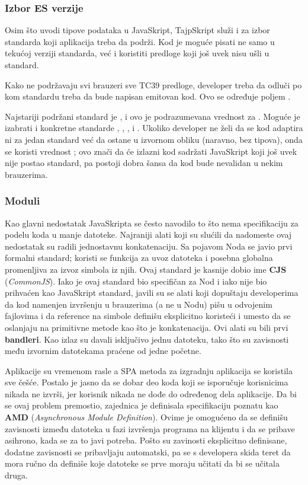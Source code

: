 \subsubsection{Izbor ES verzije}

Osim što uvodi tipove podataka u JavaSkript, TajpSkript služi i za izbor standarda koji aplikacija treba da podrži.
Kod je moguće pisati ne samo u tekućoj verziji standarda, već i koristiti predloge koji još uvek nisu ušli u standard.

Kako ne podržavaju svi brauzeri sve TC39 predloge, developer treba da odluči po kom standardu treba da bude napisan emitovan kod.
Ovo se određuje poljem .

Najstariji podržani standard je , i ovo je podrazumevana vrednost za .
Moguće je izabrati i konkretne standarde , , ,  i .
Ukoliko developer ne želi da se kod adaptira ni za jedan standard već da ostane u izvornom obliku (naravno, bez tipova), onda se koristi vrednost ; ovo znači da će izlazni kod sadržati JavaSkript koji još uvek nije postao standard, pa postoji dobra šansa da kod bude nevalidan u nekim brauzerima.

\subsubsection{Moduli}

Kao glavni nedostatak JavaSkripta se često navodilo to što nema specifikaciju za podelu koda u manje datoteke.
Najraniji alati koji su slućili da nadomeste ovaj nedostatak su radili jednostavnu konkatenaciju.
Sa pojavom Noda se javio prvi formalni standard; koristi se funkcija  za uvoz datoteka i posebna globalna promenljiva  za izvoz simbola iz njih.
Ovaj standard je kasnije dobio ime \textbf{CJS} (\textsl{CommonJS}).
Iako je ovaj standard bio specifičan za Nod i iako nije bio prihvaćen kao JavaSkript standard, javili su se alati koji dopuštaju developerima da kod namenjen izvršenju u brauzerima (a ne u Nodu) pišu u odvojenim fajlovima i da reference na simbole definišu eksplicitno koristeći  i  umesto da se oslanjaju na primitivne metode kao što je konkatenacija.
Ovi alati su bili prvi \textbf{bandleri}.
Kao izlaz su davali isključivo jednu  datoteku, tako što su zavisnosti među izvornim datotekama praćene od jedne početne.

Aplikacije su vremenom rasle a SPA metoda za izgradnju aplikacija se koristila sve češće.
Postalo je jasno da se dobar deo koda koji se isporučuje korisnicima nikada ne izvrši, jer korisnik nikada ne dođe do određenog dela aplikacije.
Da bi se ovaj problem premostio, zajednica je definisala specifikaciju poznatu kao \textbf{AMD} (\textsl{Asynchronous Module Definition}).
Ovime je omogućeno da se definišu zavisnosti između datoteka u fazi izvršenja programa na klijentu i da se pribave asihrono, kada se za to javi potreba.
Pošto su zavinosti eksplicitno definisane, dodatne zavisnosti se pribavljaju automatski, pa se s developera skida teret da mora ručno da definiše koje datoteke se prve moraju učitati da bi se učitala druga.

